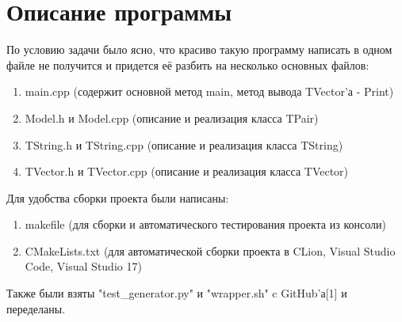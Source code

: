 \documentclass[pdf, unicode, 12pt, a4paper,oneside,fleqn]{article}
\begin{document}
\section{Описание программы}
По условию задачи было ясно, что красиво такую программу написать в одном файле не получится и придется её разбить на несколько основных файлов:
\begin{enumerate}
\item main.cpp (содержит основной метод main, метод вывода TVector'а - Print)
\item Model.h и Model.cpp (описание и реализация класса TPair)
\item TString.h и TString.cpp (описание и реализация класса TString)
\item TVector.h и TVector.cpp (описание и реализация класса TVector)
\end{enumerate}
Для удобства сборки проекта были написаны: 
\begin{enumerate}
\item makefile (для сборки и автоматического тестирования проекта из консоли)
\item CMakeLists.txt (для автоматической сборки проекта в CLion, Visual Studio Code, Visual Studio 17)
\end{enumerate}
Также были взяты "test\_generator.py" и "wrapper.sh" c GitHub'а[1] и переделаны.
\newpage
\end{document}
